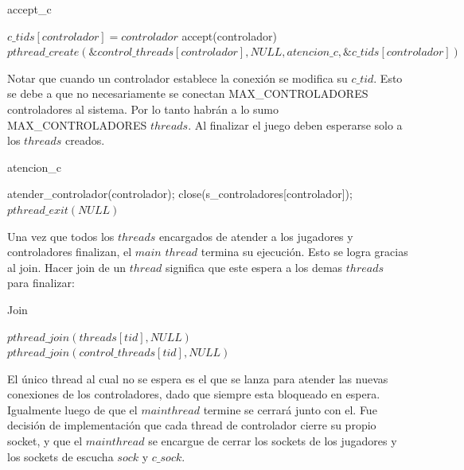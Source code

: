 \begin{algorithm}[H]
\caption{accept\_c}\label{ej1}
\begin{algorithmic}[1]
		\State $c\_tids[controlador]= controlador$
		\State accept(controlador)
		\State $pthread\_create(\&control\_threads[controlador],NULL,atencion\_c,\&c\_tids[controlador])$
	\EndFor
\EndProcedure
\end{algorithmic}
\end{algorithm}

Notar que cuando un controlador establece la conexión se modifica su $c\_tid$. Esto se debe a que no necesariamente se conectan MAX\_CONTROLADORES controladores al sistema. Por lo tanto habrán a lo sumo MAX\_CONTROLADORES $threads$. Al finalizar el juego deben esperarse solo a los $threads$ creados.

\begin{algorithm}[H]
\caption{atencion\_c}\label{ej1}
\begin{algorithmic}[1]
	\State atender\_controlador(controlador);
	\State close(s\_controladores[controlador]);
	\State $pthread\_exit(NULL)$
\EndProcedure
\end{algorithmic}
\end{algorithm}

Una vez que todos los $threads$ encargados de atender a los jugadores y controladores finalizan, el $main$ $thread$ termina su ejecución. Esto se logra gracias al join. Hacer join de un $thread$ significa que este espera a los demas $threads$ para finalizar:

\begin{algorithm}[H]
\caption{Join}\label{ej1}
\begin{algorithmic}[1]
		\State $pthread\_join(threads[tid], NULL)$
	\EndFor
	 
		\State $pthread\_join(control\_threads[tid], NULL)$
	\EndFor
\EndProcedure
\end{algorithmic}
\end{algorithm}

El único thread al cual no se espera es el que se lanza para atender las nuevas conexiones de los controladores, dado que siempre esta bloqueado en espera. Igualmente luego de que el $main thread$ termine se cerrará junto con el. Fue decisión de implementación que cada thread de controlador cierre su propio socket, y que el $main thread$ se encargue de cerrar los sockets de los jugadores y los sockets de escucha $sock$ y $c\_sock$.